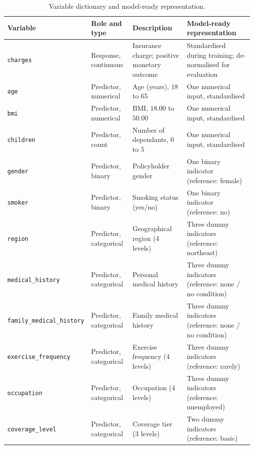 \begin{table}[H]
\centering
\small
\renewcommand{\arraystretch}{1.15}
\newcommand{\nohyph}{\raggedright\arraybackslash
  \hyphenpenalty=10000 \exhyphenpenalty=10000}
\begin{tabular}{%
  >{\nohyph}p{}%
  >{\nohyph}p{}%
  >{\nohyph}p{}%
  >{\nohyph}p{}}
\toprule
\textbf{Variable} & \textbf{Role and type} & \textbf{Description} & \textbf{Model-ready representation} \\
\midrule
\texttt{charges} & Response, continuous & Insurance charge; positive monetary outcome & Standardised during training; de-normalised for evaluation \\
\texttt{age} & Predictor, numerical & Age (years), $18$ to $65$ & One numerical input, standardised \\
\texttt{bmi} & Predictor, numerical & BMI, $18.00$ to $50.00$ & One numerical input, standardised \\
\texttt{children} & Predictor, count & Number of dependants, $0$ to $5$ & One numerical input, standardised \\
\texttt{gender} & Predictor, binary & Policyholder gender & One binary indicator (reference: female) \\
\texttt{smoker} & Predictor, binary & Smoking status (yes/no) & One binary indicator (reference: no) \\
\texttt{region} & Predictor, categorical & Geographical region (4 levels) & Three dummy indicators (reference: northeast) \\
\texttt{medical\_\allowbreak{}history} & Predictor, categorical & Personal medical history & Three dummy indicators (reference: none / no condition) \\
\texttt{family\_medical\_\allowbreak{}history} & Predictor, categorical & Family medical history & Three dummy indicators (reference: none / no condition) \\
\texttt{exercise\_\allowbreak{}frequency} & Predictor, categorical & Exercise frequency (4 levels) & Three dummy indicators (reference: rarely) \\
\texttt{occupation} & Predictor, categorical & Occupation (4 levels) & Three dummy indicators (reference: unemployed) \\
\texttt{coverage\_\allowbreak{}level} & Predictor, categorical & Coverage tier (3 levels) & Two dummy indicators (reference: basic) \\
\bottomrule
\end{tabular}
\caption{Variable dictionary and model-ready representation.}
\label{tab:variable_dictionary_ch3}
\end{table}

